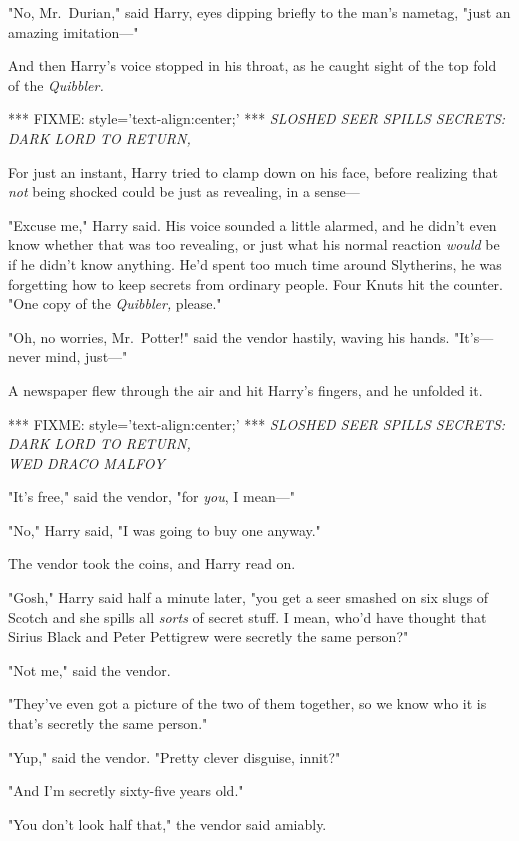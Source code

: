"No, Mr.~Durian," said Harry, eyes dipping briefly to the man's nametag, "just 
an amazing imitation---"

And then Harry's voice stopped in his throat, as he caught sight of the top 
fold of the \emph{Quibbler.}

*** FIXME: style='text-align:center;' ***
\emph{SLOSHED SEER SPILLS SECRETS:\\
DARK LORD TO RETURN,}

For just an instant, Harry tried to clamp down on his face, before realizing 
that \emph{not} being shocked could be just as revealing, in a sense---

"Excuse me," Harry said. His voice sounded a little alarmed, and he didn't even 
know whether that was too revealing, or just what his normal reaction 
\emph{would} be if he didn't know anything. He'd spent too much time around 
Slytherins, he was forgetting how to keep secrets from ordinary people. Four 
Knuts hit the counter. "One copy of the \emph{Quibbler,} please."

"Oh, no worries, Mr.~Potter!" said the vendor hastily, waving his hands. 
"It's---never mind, just---"

A newspaper flew through the air and hit Harry's fingers, and he unfolded it.

*** FIXME: style='text-align:center;' ***
\emph{SLOSHED SEER SPILLS SECRETS:\\
DARK LORD TO RETURN,\\
WED DRACO MALFOY}

"It's free," said the vendor, "for \emph{you}, I mean---"

"No," Harry said, "I was going to buy one anyway."

The vendor took the coins, and Harry read on.

"Gosh," Harry said half a minute later, "you get a seer smashed on six slugs of 
Scotch and she spills all \emph{sorts} of secret stuff. I mean, who'd have 
thought that Sirius Black and Peter Pettigrew were secretly the same person?"

"Not me," said the vendor.

"They've even got a picture of the two of them together, so we know who it is 
that's secretly the same person."

"Yup," said the vendor. "Pretty clever disguise, innit?"

"And I'm secretly sixty-five years old."

"You don't look half that," the vendor said amiably.

